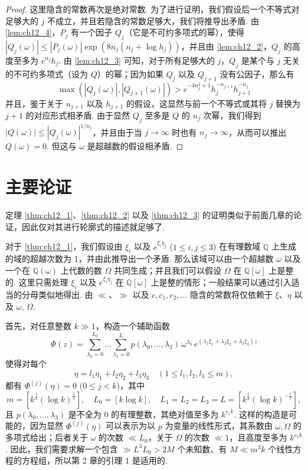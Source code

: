 \begin{proof}
这里隐含的常数再次是绝对常数. 为了进行证明，我们假设后一个不等式对足够大的 $j$ 不成立，并且若隐含的常数足够大，我们将推导出矛盾. 由 \autoref{lem:ch12_4}，$P_j$ 有一个因子 $Q_j$（它是不可约多项式的幂），使得 $|Q_j(\omega)| \le |P_j(\omega)| \exp(8n_j(n_j + \log h_j))$，并且由 \autoref{lem:ch12_2}，$Q_j$ 的高度至多为 $e^{n_j} h_j$. 由 \autoref{lem:ch12_3} 可知，对于所有足够大的 $j$，$Q_j$ 是某个与 $j$ 无关的不可约多项式（设为 $Q$）的幂；因为如果 $Q_j$ 以及 $Q_{j+1}$ 没有公因子，那么有
\[\max(|Q_j(\omega)|, |Q_{j+1}(\omega)|) > e^{-4n_j^2+1} h_j^{-n_{j+1}} h_{j+1}^{-n_j}\]
并且，鉴于关于 $n_{j+1}$ 以及 $h_{j+1}$ 的假设，这显然与前一个不等式或其将 $j$ 替换为 $j+1$ 的对应形式相矛盾. 由于显然 $Q_j$ 至多是 $Q$ 的 $n_j$ 次幂，我们得到 $|Q(\omega)| \le |Q_j(\omega)|^{1/n_j}$，并且由于当 $j \to \infty$ 时也有 $n_j \to \infty$，从而可以推出 $Q(\omega) = 0$. 但这与 $\omega$ 是超越数的假设相矛盾.
\end{proof}

\section{主要论证}

定理 \ref{thm:ch12_1}、\ref{thm:ch12_2} 以及 \ref{thm:ch12_3} 的证明类似于前面几章的论证，因此仅对其进行轮廓式的描述就足够了.

对于 \autoref{thm:ch12_1}，我们假设由 $\xi_i$ 以及 $e^{\xi_i \eta_j}$ ($1 \le i, j \le 3$) 在有理数域 $\mathbb{Q}$ 上生成的域的超越次数为 1，并由此推导出一个矛盾. 那么该域可以由一个超越数 $\omega$ 以及一个在 $\mathbb{Q}(\omega)$ 上代数的数 $\Omega$ 共同生成；并且我们可以假设 $\Omega$ 在 $\mathbb{Q}[\omega]$ 上是整的. 这里只需处理 $\xi_i$ 以及 $e^{\xi_i \eta_j}$ 在 $\mathbb{Q}[\omega]$ 上是整的情形；一般结果可以通过引入适当的分母类似地得出. 由 $\ll$、$\gg$ 以及 $c, c_1, c_2, \dots$ 隐含的常数将仅依赖于 $\xi$、$\eta$ 以及 $\omega$, $\Omega$.

首先，对任意整数 $k \gg 1$，构造一个辅助函数
\[\Phi(z) = \sum_{\lambda_0=0}^{L_0} \dots \sum_{\lambda_3=0}^{L} p(\lambda_0, \dots, \lambda_3) \, \omega^{\lambda_0} \, e^{(\lambda_1 \xi_1 + \lambda_2 \xi_2 + \lambda_3 \xi_3) z}\]
使得对每个
\[\eta = l_1 \eta_1 + l_2 \eta_2 + l_3 \eta_3 \quad (1 \leq l_1, l_2, l_3 \leq m),\]
都有 $\Phi^{(j)}(\eta) = 0$ ($0 \le j < k$)，其中
\[m = [k^{\frac{1}{2}}(\log k)^{\frac{1}{2}}], \quad L_0 = [k \log k], \quad L_1 = L_2 = L_3 = L = [k^{\frac{1}{2}}(\log k)^{-\frac{1}{2}}],\]
且 $p(\lambda_0, \dots, \lambda_3)$ 是不全为 0 的有理整数，其绝对值至多为 $k^{c_1 k}$. 这样的构造是可能的，因为显然 $\Phi^{(j)}(\eta)$ 可以表示为以 $p$ 为变量的线性形式，其系数由 $\omega, \Omega$ 的多项式给出；后者关于 $\omega$ 的次数 $\ll L_0$，关于 $\Omega$ 的次数 $\ll 1$，且高度至多为 $k^{c_1 k}$. 因此，我们需要求解一个包含 $\gg L^3 L_0 > 2M$ 个未知数、有 $M \ll m^3 k$ 个线性方程的方程组，所以第 2 章的引理 1 是适用的.

